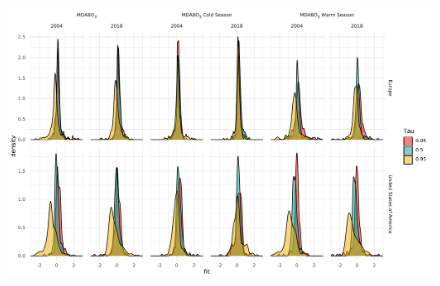 \documentclass{article}
\begin{document}
\begin{figure}
\centering
\includegraphics[width=\linewidth]{figures/si_figures/fS04_slope_density.pdf}
\caption{}
\label{si_fig:slope_density}
\end{figure}
\clearpage

\end{document}
